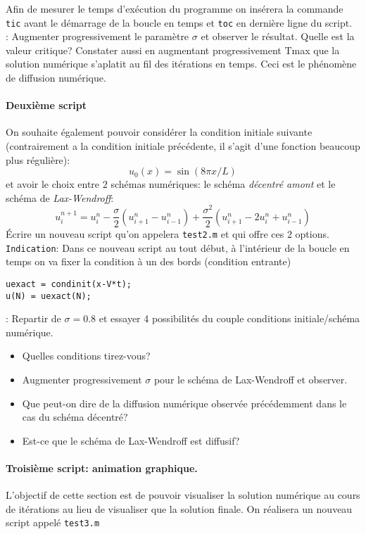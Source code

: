 \documentclass[12pt,a4paper]{article}
\begin{document}
\noindent Afin de mesurer le temps
d'ex\'ecution du programme on ins\'erera la commande \texttt{tic} 
avant le d\'emarrage de la boucle en temps et \texttt{toc} en derni\`ere ligne du
script.\\

: Augmenter progressivement le param\`etre $\sigma$ et
observer le r\'esultat. Quelle est la valeur critique? Constater aussi en augmentant progressivement Tmax que la solution numérique s'aplatit au fil des itérations en temps. Ceci est le phénomène de diffusion numérique.

\paragraph{Deuxi\`eme script} On souhaite \'egalement pouvoir consid\'erer la condition initiale suivante (contrairement a la condition initiale précédente, il s'agit d'une fonction beaucoup plus régulière):
$$
u_0(x) = \sin(8\pi x/L)
$$ 
et avoir le choix entre $2$ sch\'emas num\'eriques: le sch\'ema
{\it décentré amont} et le sch\'ema de {\it Lax-Wendroff}:
$$
u_i^{n+1}=u_i^n-\frac{\sigma}{2}(u_{i+1}^n-u_{i-1}^n)+\frac{\sigma^2}{2}(u_{i+1}^n-2u_i^n+u_{i-1}^n)
$$
\'Ecrire un nouveau script qu'on appelera \texttt{test2.m} et qui offre ces $2$ options.\\

\noindent \texttt{Indication}: Dans ce nouveau script au tout début, à l'intérieur de la boucle en temps on va fixer la condition à un des bords (condition entrante)

\begin{verbatim}
uexact = condinit(x-V*t);
u(N) = uexact(N);
\end{verbatim}

:  Repartir de $\sigma=0.8$ et essayer 4 possibilit\'es
du couple conditions initiale/sch\'ema num\'erique. 
\begin{itemize}
\item Quelles conditions
tirez-vous?
\item Augmenter progressivement $\sigma$ pour le sch\'ema de
Lax-Wendroff et observer. 
\item Que peut-on dire de la diffusion numérique observée précédemment dans le cas du schéma décentré?
\item Est-ce que le schéma de Lax-Wendroff est diffusif?
\end{itemize}
\paragraph{Troisi\`eme script: animation graphique.} L'objectif
de cette section est de pouvoir visualiser la solution num\'erique au cours de it\'erations au lieu de visualiser que la
solution finale. On r\'ealisera un nouveau script appel\'e
\texttt{test3.m}
\end{document}
